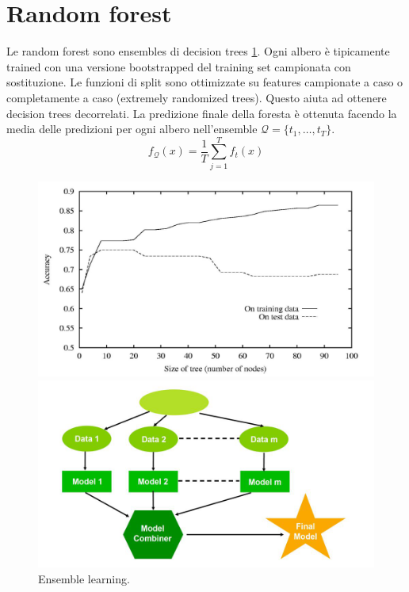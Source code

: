 \section{Random forest}
Le random forest sono ensembles di decision trees \ref{fig:chapter05-08}.
Ogni albero \`e tipicamente trained con una versione bootstrapped del training set campionata con sostituzione.
Le funzioni di split sono ottimizzate su features campionate a caso o completamente a caso (extremely randomized trees).
Questo aiuta ad ottenere decision trees decorrelati.
La predizione finale della foresta \`e ottenuta facendo la media delle predizioni per ogni albero nell'ensemble $\mathcal{Q}=\{t_1,\dots,t_T\}$.
$$f_\mathcal{Q}(x)=\dfrac{1}{T}\sum\limits_{j=1}^Tf_t(x)$$

\begin{figure}
	\centering
	\begin{minipage}{.5\textwidth}
		\centering
		\includegraphics[width=1\linewidth]{imgs/chapter5/img7}
		\caption{Decision trees e overfitting. Aumentare il numero di nodi sui dati di training sembrava una buona idea quando non lo era sui dati di test.}
		\label{fig:chapter05-07}
	\end{minipage}%
	\begin{minipage}{.5\textwidth}
		\centering
		\includegraphics[width=1\linewidth]{imgs/chapter5/img8}
		\caption{Ensemble learning.}
		\label{fig:chapter05-08}
	\end{minipage}
\end{figure}

